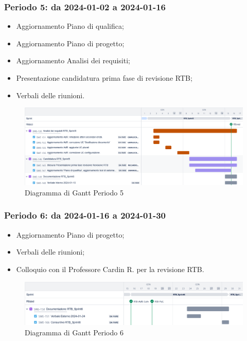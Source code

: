 \documentclass[10pt, a4paper]{article}
\begin{document}
{{{{{{{{\subsubsection{Periodo 5: da 2024-01-02 a 2024-01-16}
\begin{itemize}
    \item Aggiornamento Piano di qualifica;
    \item Aggiornamento Piano di progetto;
    \item Aggiornamento Analisi dei requisiti;
    \item Presentazione candidatura prima fase di revisione RTB;
    \item Verbali delle riunioni.
\end{itemize}
\begin{figure}[H]
    \centering        
    \includegraphics[width=15.5cm]{gantt/ganttPeriodo5.png}
    \caption{Diagramma di Gantt Periodo 5}
\end{figure}

\subsubsection{Periodo 6: da 2024-01-16 a 2024-01-30}
%
\begin{itemize}
    \item Aggiornamento Piano di progetto;
    \item Verbali delle riunioni;
    \item Colloquio con il Professore Cardin R. per la revisione RTB.
\end{itemize}
\begin{figure}[H]
    \centering        
    \includegraphics[width=15.5cm]{gantt/ganttPeriodo6.png}
    \caption{Diagramma di Gantt Periodo 6}
\end{figure}

}}}}}}}}
\end{document}
